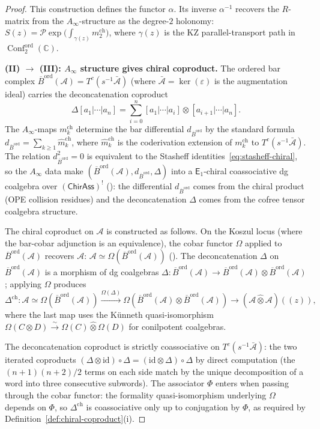 \documentclass[11pt,reqno]{amsart}
\theoremstyle{definition}
\theoremstyle{remark}
\newcommand{\cA}{\mathcal{A}}
\newcommand{\cP}{\mathcal{P}}
\newcommand{\Ainf}{A_{\infty}}
\newcommand{\Eone}{\mathsf{E}_{1}}
\DeclareMathOperator{\Conf}{Conf}
\newcommand{\Barord}{\overline{B}^{\mathrm{ord}}}
\newcommand{\CC}{\mathbb{C}}
\newcommand{\id}{\mathrm{id}}
\numberwithin{equation}{section}
\begin{document}
\begin{proof}
This construction defines the functor $\alpha$. Its
inverse $\alpha^{-1}$ recovers the $R$-matrix from the
$\Ainf$-structure as the degree-$2$ holonomy:
$S(z) = \cP \exp\bigl(\int_{\gamma(z)}
m_2^{\mathrm{ch}}\bigr)$,
where $\gamma(z)$ is the KZ parallel-transport path in
$\Conf_2^{\mathrm{ord}}(\CC)$.

\medskip
\noindent
\textbf{(II) $\boldsymbol{\to}$ (III): $\Ainf$ structure
gives chiral coproduct.}
The ordered bar complex
$\Barord(\cA) = T^c(s^{-1}\bar{\cA})$
(where $\bar{\cA} = \ker(\varepsilon)$ is the augmentation
ideal) carries the deconcatenation coproduct
\begin{equation}\label{eq:deconc-coprod}
  \Delta[a_1 | \cdots | a_n]
  = \sum_{i=0}^{n}
  [a_1 | \cdots | a_i]
  \otimes [a_{i+1} | \cdots | a_n].
\end{equation}
The $\Ainf$-maps $m_k^{\mathrm{ch}}$ determine the bar
differential $d_{\Barord}$ by the standard formula
$d_{\Barord} = \sum_{k \geq 1} \hat{m}_k^{\mathrm{ch}}$,
where $\hat{m}_k^{\mathrm{ch}}$ is the coderivation
extension of $m_k^{\mathrm{ch}}$ to
$T^c(s^{-1}\bar{\cA})$. The relation
$d_{\Barord}^2 = 0$ is equivalent to the Stasheff
identities~\eqref{eq:stasheff-chiral}, so the $\Ainf$
data make $(\Barord(\cA), d_{\Barord}, \Delta)$ into a
$\Eone$-chiral coassociative dg coalgebra
over $(\mathsf{ChirAss})^!$
(\cite[Theorem~1.2]{Lorgat26I}): the differential
$d_{\Barord}$ comes from the chiral product (OPE collision residues) and the
deconcatenation $\Delta$ comes from the cofree tensor coalgebra structure.

The chiral coproduct on $\cA$ is constructed as follows.
On the Koszul locus (where the bar-cobar adjunction is
an equivalence), the cobar functor $\Omega$ applied to
$\Barord(\cA)$ recovers $\cA$:
$\cA \simeq \Omega(\Barord(\cA))$
(\cite[Theorem~1.1(i)]{Lorgat26I}).
The deconcatenation $\Delta$ on $\Barord(\cA)$ is a
morphism of dg coalgebras
$\Delta \colon \Barord(\cA) \to
\Barord(\cA) \otimes \Barord(\cA)$; applying $\Omega$
produces
\begin{equation}\label{eq:coprod-from-bar}
  \Delta^{\mathrm{ch}} \colon
  \cA \simeq \Omega(\Barord(\cA))
  \xrightarrow{\Omega(\Delta)}
  \Omega(\Barord(\cA) \otimes \Barord(\cA))
  \to (\cA \mathbin{\hat{\otimes}} \cA)((z)),
\end{equation}
where the last map uses the K\"unneth quasi-isomorphism
$\Omega(C \otimes D)
\xrightarrow{\sim}
\Omega(C) \mathbin{\hat{\otimes}} \Omega(D)$ for
conilpotent coalgebras.

The deconcatenation coproduct is strictly coassociative
on $T^c(s^{-1}\bar{\cA})$: the two iterated coproducts
$(\Delta \otimes \id) \circ \Delta
= (\id \otimes \Delta) \circ \Delta$ by direct
computation (the $(n+1)(n+2)/2$ terms on each side match
by the unique decomposition of a word into three
consecutive subwords). The associator $\Phi$ enters when
passing through the cobar functor: the formality
quasi-isomorphism underlying $\Omega$ depends on $\Phi$,
so $\Delta^{\mathrm{ch}}$ is coassociative only up to
conjugation by $\Phi$, as required by
Definition~\ref{def:chiral-coproduct}(i).


\end{proof}
\end{document}
